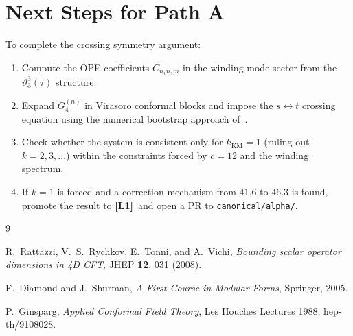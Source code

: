 \documentclass[12pt,a4paper]{article}
\theoremstyle{definition}
\theoremstyle{remark}
\newcommand{\Lone}{\textbf{[L1]}}
\newcommand{\vth}{\vartheta}
\begin{document}
\section{Next Steps for Path A}
\label{sec:nextsteps}

To complete the crossing symmetry argument:

\begin{enumerate}
  \item Compute the OPE coefficients $C_{n_1 n_2 m}$ in the winding-mode
        sector from the $\vth_3^3(\tau)$ structure.

  \item Expand $G_4^{(n)}$ in Virasoro conformal blocks and impose the
        $s \leftrightarrow t$ crossing equation using the numerical bootstrap
        approach of~\cite{rattazzi2008}.

  \item Check whether the system is consistent only for $k_{\mathrm{KM}} = 1$
        (ruling out $k = 2, 3, \ldots$) within the constraints forced by
        $c = 12$ and the winding spectrum.

  \item If $k = 1$ is forced and a correction mechanism from $41.6$ to $46.3$
        is found, promote the result to \Lone\ and open a PR to
        \texttt{canonical/alpha/}.
\end{enumerate}

\begin{thebibliography}{9}

R.~Rattazzi, V.~S.~Rychkov, E.~Tonni, and A.~Vichi,
\emph{Bounding scalar operator dimensions in 4D CFT},
JHEP \textbf{12}, 031 (2008).

F.~Diamond and J.~Shurman,
\emph{A First Course in Modular Forms}, Springer, 2005.

P.~Ginsparg, \emph{Applied Conformal Field Theory},
Les Houches Lectures 1988, hep-th/9108028.

\end{thebibliography}
\end{document}
